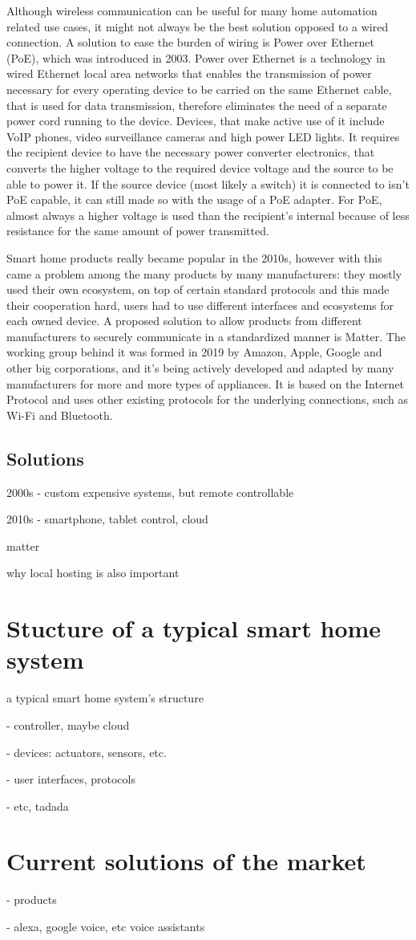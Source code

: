 Although wireless communication can be useful for many home automation related use cases, it might not always be the best solution opposed to a wired connection. A solution to ease the burden of wiring is Power over Ethernet (PoE), which was introduced in 2003. \cite{TTPoE} Power over Ethernet is a technology in wired Ethernet local area networks that enables the transmission of power necessary for every operating device to be carried on the same Ethernet cable, that is used for data transmission, therefore eliminates the need of a separate power cord running to the device. Devices, that make active use of it include VoIP phones, video surveillance cameras and high power LED lights. It requires the recipient device to have the necessary power converter electronics, that converts the higher voltage to the required device voltage and the source to be able to power it. If the source device (most likely a switch) it is connected to isn't PoE capable, it can still made so with the usage of a PoE adapter. For PoE, almost always a higher voltage is used than the recipient's internal because of less resistance for the same amount of power transmitted.\break

Smart home products really became popular in the 2010s, however with this came a problem among the many products by many manufacturers: they mostly used their own ecosystem, on top of certain standard protocols and this made their cooperation hard, users had to use different interfaces and ecosystems for each owned device. A proposed solution to allow products from different manufacturers to securely communicate in a standardized manner is Matter. \cite{PCMagMatter} The working group behind it was formed in 2019 by Amazon, Apple, Google and other big corporations, and it's being actively developed and adapted by many manufacturers for more and more types of appliances. It is based on the Internet Protocol and uses other existing protocols for the underlying connections, such as Wi-Fi and Bluetooth.

\subsection{Solutions}

2000s - custom expensive systems, but remote controllable

2010s - smartphone, tablet control, cloud

matter

why local hosting is also important

\section{Stucture of a typical smart home system}
a typical smart home system's structure

- controller, maybe cloud

- devices: actuators, sensors, etc.

- user interfaces, protocols

- etc, tadada

\section{Current solutions of the market}
- products

- alexa, google voice, etc voice assistants
